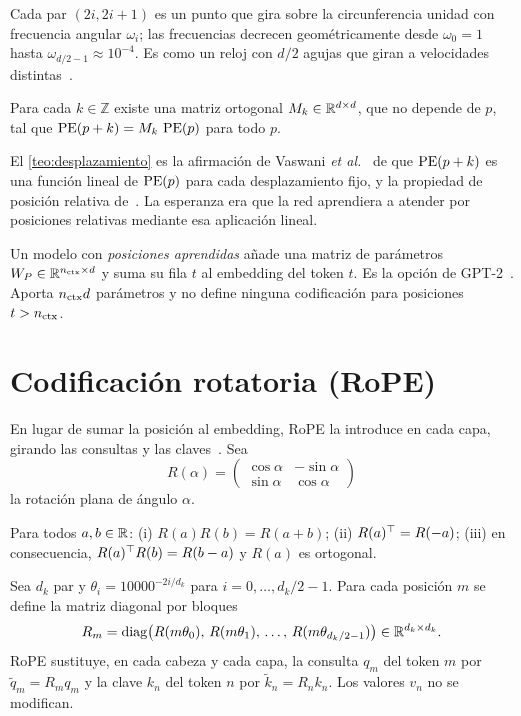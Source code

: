 Cada par $(2i,2i+1)$ es un punto que gira sobre la circunferencia unidad con frecuencia angular $\omega_i$; las frecuencias decrecen geométricamente desde $\omega_0=1$ hasta $\omega_{d/2-1}\approx 10^{-4}$. Es como un reloj con $d/2$ agujas que giran a velocidades distintas~\cite[§11.6.3.1]{d2l}.

\addtocounter{definicion}{1}%

\begin{teorema}\label{teo:desplazamiento}
Para cada $k\in\mathbb{Z}$ existe una matriz ortogonal $M_k\in\mathbb{R}^{d\times d}$, que no depende de $p$, tal que $\operatorname{PE}(p+k)=M_k\,\operatorname{PE}(p)$ para todo $p$.
\end{teorema}

El \cref{teo:desplazamiento} es la afirmación de Vaswani \emph{et al.}~\cite[§3.5]{vaswani} de que $\operatorname{PE}(p+k)$ es una función lineal de $\operatorname{PE}(p)$ para cada desplazamiento fijo, y la propiedad de posición relativa de~\cite[§11.6.3.2]{d2l}. La esperanza era que la red aprendiera a atender por posiciones relativas mediante esa aplicación lineal.

\begin{definicion}
Un modelo con \emph{posiciones aprendidas} añade una matriz de parámetros $W_P\in\mathbb{R}^{n_{\mathrm{ctx}}\times d}$ y suma su fila $t$ al embedding del token $t$. Es la opción de GPT-2~\cite{gpt2}. Aporta $n_{\mathrm{ctx}} d$ parámetros y no define ninguna codificación para posiciones $t>n_{\mathrm{ctx}}$.
\end{definicion}

\section{Codificación rotatoria (RoPE)}

En lugar de sumar la posición al embedding, RoPE la introduce en cada capa, girando las consultas y las claves~\cite{roformer}. Sea
\[
R(\alpha)=\begin{pmatrix}\cos\alpha&-\sin\alpha\\ \sin\alpha&\cos\alpha\end{pmatrix}
\]
la rotación plana de ángulo $\alpha$.

\begin{lema}\label{lem:rotaciones}
Para todos $a,b\in\mathbb{R}$: (i) $R(a)R(b)=R(a+b)$; (ii) $R(a)^{\top}=R(-a)$; (iii) en consecuencia, $R(a)^{\top} R(b)=R(b-a)$ y $R(a)$ es ortogonal.
\end{lema}

\begin{definicion}[RoPE]\label{def:rope}
Sea $d_k$ par y $\theta_i=10000^{-2i/d_k}$ para $i=0,\dots,d_k/2-1$. Para cada posición $m$ se define la matriz diagonal por bloques
\[
R_m=\operatorname{diag}\bigl(R(m\theta_0),\,R(m\theta_1),\,\dots,\,R(m\theta_{d_k/2-1})\bigr)\in\mathbb{R}^{d_k\times d_k}.
\]
RoPE sustituye, en cada cabeza y cada capa, la consulta $q_m$ del token $m$ por $\tilde q_m=R_mq_m$ y la clave $k_n$ del token $n$ por $\tilde k_n=R_nk_n$. Los valores $v_n$ no se modifican.
\end{definicion}

